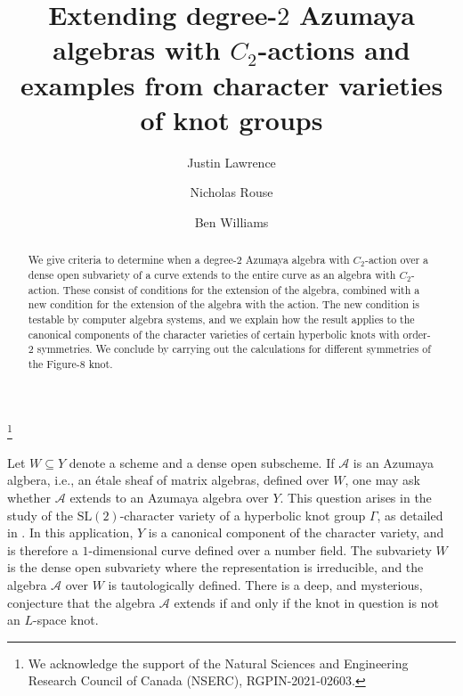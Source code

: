 \documentclass[reqno,oneside,dvipsnames,pdfnames,final]{amsart}
\theoremstyle{definition}
\newcommand{\SL}{\mathrm{SL}}
\newcommand{\sh}[1]{\mathcal{#1}}
\begin{document}
\title{Extending degree-$2$ Azumaya algebras with $C_2$-actions and examples from character varieties of knot groups}
\author{Justin Lawrence}
\address{Department of Mathematics\\
  The University of British Columbia\\
  BC V6T 1Z2\\
  CANADA}
\author{Nicholas Rouse}
\author{Ben Williams}

\begin{abstract}
  We give criteria to determine when a degree-$2$ Azumaya algebra with $C_2$-action over a dense open subvariety of a curve extends to the entire curve as an algebra with $C_2$-action. These consist of conditions for the extension of the algebra, combined with a new condition for the extension of the algebra with the action. The new condition is testable by computer algebra systems, and we explain how the result applies to the canonical components of the character varieties of certain hyperbolic knots with order-$2$ symmetries. We conclude by carrying out the calculations for different symmetries of the Figure-$8$ knot.
\end{abstract}
\thanks{We acknowledge the support of the Natural Sciences and Engineering Research Council of Canada (NSERC), RGPIN-2021-02603.}

\maketitle

Let $W \subseteq Y$ denote a scheme and a dense open subscheme. If $\sh A$ is an Azumaya algbera, i.e., an \'etale sheaf of matrix algebras, defined over $W$, one may ask whether $\sh A$ extends to an Azumaya algebra over $Y$. This question arises in the study of the $\SL(2)$-character variety of a hyperbolic knot group $\Gamma$, as detailed in \cite{Chinburg2020}. In this application, $Y$ is a canonical component of the character variety, and is therefore a $1$-dimensional curve defined over a number field. The subvariety $W$ is the dense open subvariety where the representation is irreducible, and the algebra $\sh A$ over $W$ is tautologically defined. There is a deep, and mysterious, conjecture \cite[Conjecture 6.9]{Chinburg2020} that the algebra $\sh A$ extends if and only if the knot in question is not an $L$-space knot.
\end{document}
